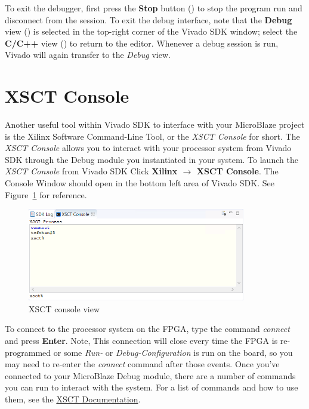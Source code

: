\documentclass[11pt]{article}
\begin{document}
To exit the debugger, first press the \textbf{Stop} button () to stop the program run and disconnect from the session. To exit the debug interface, note that the \textbf{Debug} view () is selected in the top-right corner of the Vivado SDK window; select the \textbf{C/C++} view () to return to the editor. Whenever a debug session is run, Vivado will again transfer to the \textit{Debug} view.



\section{XSCT Console}
Another useful tool within Vivado SDK to interface with your MicroBlaze project is the Xilinx Software Command-Line Tool, or the \textit{XSCT Console} for short. The \textit{XSCT Console} allows you to interact with your processor system from Vivado SDK through the Debug module you instantiated in your system. To launch the \textit{XSCT Console} from Vivado SDK Click \textbf{Xilinx $\rightarrow$ XSCT Console}. The Console Window should open in the bottom left area of Vivado SDK. See Figure~\ref{fig:xsct_console} for reference.

\begin{figure}[h]
    \centering
    \includegraphics[width=0.85\textwidth]{images/xsct_console.png}
    \caption{XSCT console view}
    \label{fig:xsct_console}
\end{figure}

To connect to the processor system on the FPGA, type the command \textit{connect} and press \textbf{Enter}. Note, This connection will close every time the FPGA is re-programmed or some \textit{Run-} or \textit{Debug-Configuration} is run on the board, so you may need to re-enter the \textit{connect} command after those events. Once you've connected to your MicroBlaze Debug module, there are a number of commands you can run to interact with the system. For a list of commands and how to use them, see the \href{https://www.xilinx.com/html_docs/xilinx2019_1/SDK_Doc/xsct/intro/xsct_commands.html}{XSCT Documentation}. 
\end{document}
